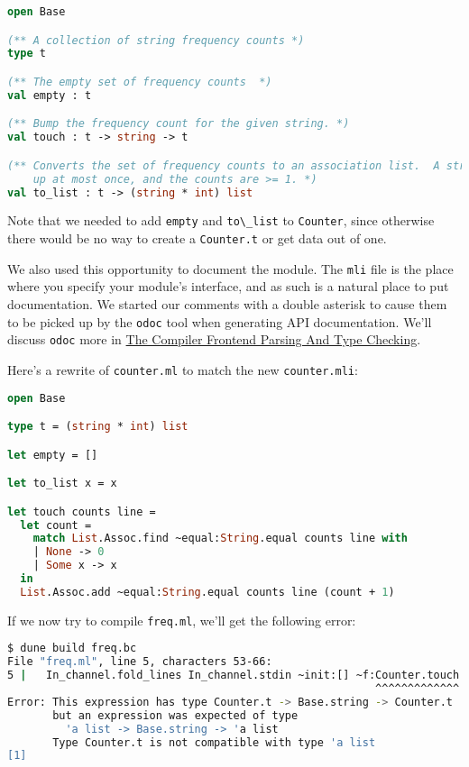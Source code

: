 \begin{lstlisting}[language=Caml]
open Base

(** A collection of string frequency counts *)
type t

(** The empty set of frequency counts  *)
val empty : t

(** Bump the frequency count for the given string. *)
val touch : t -> string -> t

(** Converts the set of frequency counts to an association list.  A string shows
    up at most once, and the counts are >= 1. *)
val to_list : t -> (string * int) list
\end{lstlisting}

Note that we needed to add \passthrough{\lstinline!empty!} and
\passthrough{\lstinline!to\_list!} to \passthrough{\lstinline!Counter!},
since otherwise there would be no way to create a
\passthrough{\lstinline!Counter.t!} or get data out of one.

We also used this opportunity to document the module. The
\passthrough{\lstinline!mli!} file is the place where you specify your
module's interface, and as such is a natural place to put documentation.
We started our comments with a double asterisk to cause them to be
picked up by the \passthrough{\lstinline!odoc!} tool when generating API
documentation. We'll discuss \passthrough{\lstinline!odoc!} more in
\href{compiler-frontend.html\#the-compiler-frontend-parsing-and-type-checking}{The
Compiler Frontend Parsing And Type Checking}.

Here's a rewrite of \passthrough{\lstinline!counter.ml!} to match the
new \passthrough{\lstinline!counter.mli!}:

\begin{lstlisting}[language=Caml]
open Base

type t = (string * int) list

let empty = []

let to_list x = x

let touch counts line =
  let count =
    match List.Assoc.find ~equal:String.equal counts line with
    | None -> 0
    | Some x -> x
  in
  List.Assoc.add ~equal:String.equal counts line (count + 1)
\end{lstlisting}

If we now try to compile \passthrough{\lstinline!freq.ml!}, we'll get
the following error:

\begin{lstlisting}[language=bash]
$ dune build freq.bc
File "freq.ml", line 5, characters 53-66:
5 |   In_channel.fold_lines In_channel.stdin ~init:[] ~f:Counter.touch
                                                         ^^^^^^^^^^^^^
Error: This expression has type Counter.t -> Base.string -> Counter.t
       but an expression was expected of type
         'a list -> Base.string -> 'a list
       Type Counter.t is not compatible with type 'a list
[1]
\end{lstlisting}

